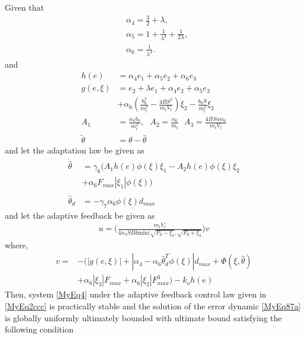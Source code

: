 \documentclass[10pt,a4paper]{amsart}
\begin{document}
\begin{theorem}
Given that
\begin{align} \label{MyEq14}
& \alpha_4= \tfrac{3}{2}+\lambda ,\nonumber \\
& \alpha_5= 1 + \tfrac{1}{\lambda^3}+\tfrac{1}{2 \lambda},\\
& \alpha_6=\tfrac{1}{\lambda^4}\nonumber.
\end{align}
and
\begin{equation} \label{MyEq99}
  \begin{split}
   h(e) &= \alpha_4e_1+\alpha_5e_2+\alpha_6e_3\\
   g(e,\xi) &= e_2+\lambda e_1+\alpha_4e_2+\alpha_5e_3\\
   &+\alpha_6(\tfrac{b_0^2}{m_t^2}-\tfrac{4BS^2}{m_tV_t})\xi_2-\tfrac{b_0S}{m_t^2}\xi_3\\
   A_1 & =\tfrac{\alpha_6b_0}{m_t^2}, \ \ \ A_2=\tfrac{\alpha_6}{m_t} \ \ \  A_3=\tfrac{4BS\alpha\alpha_6}{m_tV_t}\\
   \tilde{\theta} & = \theta -\hat \theta
  \end{split}
\end{equation}
and let the adaptation law be given as
\begin{equation}
  \begin{split}\label{MyEq99aaa}
  {\dot {\hat \theta}} &=\gamma_6(A_1h(e)\phi(\xi)\xi_1-A_2h(e)\phi(\xi)\xi_2\\
                       &+\alpha_6F_{max}|\xi_1|\phi(\xi))\\
  {\dot {\hat \theta}_d} &=-\gamma_7\alpha_6\phi(\xi)d_{max}
  \end{split}
\end{equation}
and let the adaptive feedback be given as
\begin{equation}\label{MyEq2ccc}
  \begin{split}
  u=\bigg(\tfrac{m_tV_t}{4\alpha_3SBk \text{min}(\sqrt{P_d-\xi_3},\sqrt{P_d+\xi_3}}\bigg)v
  \end{split}
\end{equation}
where,
\begin{equation}
  \begin{split}
  v=&-(|g(e,\xi)|+|\alpha_4-\alpha_6{\hat \theta}^T_d\phi(\xi)|d_{max}+\Phi(\xi,\hat \theta)\\
    &+\alpha_6|\xi_3|F_{max}+\alpha_6|\xi_2|F^3_{max})-k_oh(e)
  \end{split}
\end{equation}
Then, system \eqref{MyEq4} under the adaptive feedback control law given in \eqref{MyEq2ccc} is practically stable and the solution of the error dynamic \eqref{MyEq87a} is globally uniformly ultimately bounded with ultimate bound satisfying the following condition

\end{theorem}
\end{document}

